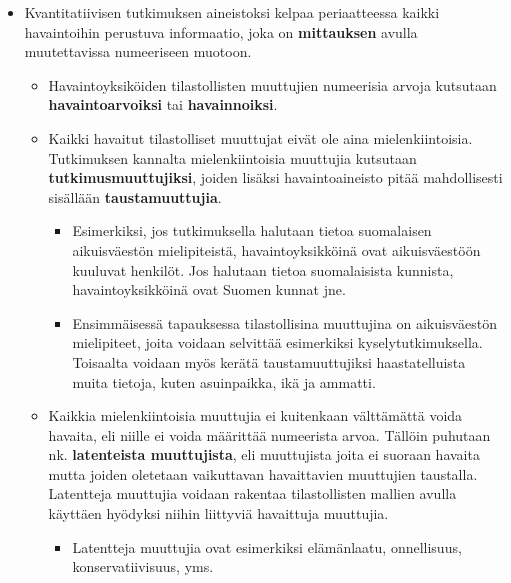 \documentclass[
]{book}
\providecommand{\tightlist}{%
  \setlength{\itemsep}{0pt}\setlength{\parskip}{0pt}}
\begin{document}
\begin{itemize}
\tightlist
\item
  Kvantitatiivisen tutkimuksen aineistoksi kelpaa periaatteessa kaikki havaintoihin perustuva informaatio, joka on \textbf{mittauksen} avulla muutettavissa numeeriseen muotoon.

  \begin{itemize}
  \tightlist
  \item
    Havaintoyksiköiden tilastollisten muuttujien numeerisia arvoja kutsutaan \textbf{havaintoarvoiksi} tai \textbf{havainnoiksi}.
  \item
    Kaikki havaitut tilastolliset muuttujat eivät ole aina mielenkiintoisia. Tutkimuksen kannalta mielenkiintoisia muuttujia kutsutaan \textbf{tutkimusmuuttujiksi}, joiden lisäksi havaintoaineisto pitää mahdollisesti sisällään \textbf{taustamuuttujia}.

    \begin{itemize}
    \tightlist
    \item
      Esimerkiksi, jos tutkimuksella halutaan tietoa suomalaisen aikuisväestön mielipiteistä, havaintoyksikköinä ovat aikuisväestöön kuuluvat henkilöt. Jos halutaan tietoa suomalaisista kunnista, havaintoyksikköinä ovat Suomen kunnat jne.
    \item
      Ensimmäisessä tapauksessa tilastollisina muuttujina on aikuisväestön mielipiteet, joita voidaan selvittää esimerkiksi kyselytutkimuksella. Toisaalta voidaan myös kerätä taustamuuttujiksi haastatelluista muita tietoja, kuten asuinpaikka, ikä ja ammatti.
    \end{itemize}
  \item
    Kaikkia mielenkiintoisia muuttujia ei kuitenkaan välttämättä voida havaita, eli niille ei voida määrittää numeerista arvoa. Tällöin puhutaan nk. \textbf{latenteista muuttujista}, eli muuttujista joita ei suoraan havaita mutta joiden oletetaan vaikuttavan havaittavien muuttujien taustalla. Latentteja muuttujia voidaan rakentaa tilastollisten mallien avulla käyttäen hyödyksi niihin liittyviä havaittuja muuttujia.

    \begin{itemize}
    \tightlist
    \item
      Latentteja muuttujia ovat esimerkiksi elämänlaatu, onnellisuus, konservatiivisuus, yms.
    \end{itemize}
  \end{itemize}
\end{itemize}

\hfill\break
\end{document}
